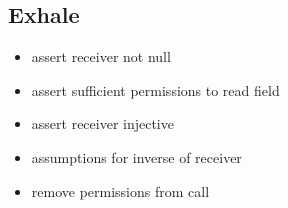 \documentclass[12pt]{article}
\begin{document}
\subsection{Exhale}
\begin{itemize}
\item assert receiver not null 
\item assert sufficient permissions to read field
\item assert receiver injective
\item assumptions for inverse of receiver
\item remove permissions from call
\end{itemize}
\end{document}
